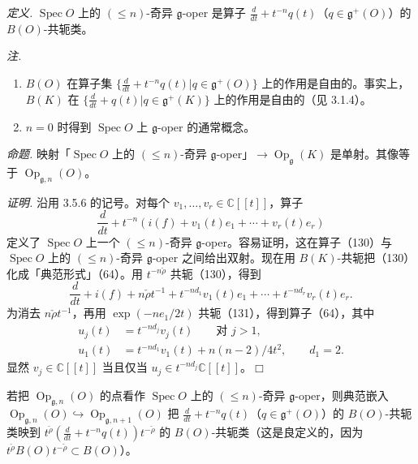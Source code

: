 
 \emph{定义.} $\operatorname{Spec}O$ 上的 $(\le n)$-奇异 $\mathfrak{g}$-oper 是算子 $\frac{d}{dt}+t^{-n}q(t)$（$q\in\mathfrak{g}^{+}(O)$）的 $B(O)$-共轭类。

\emph{注.}
\begin{enumerate}[label=(\roman*),leftmargin=2.2em]
\item $B(O)$ 在算子集 $\{\frac{d}{dt}+t^{-n}q(t)|q\in\mathfrak{g}^{+}(O)\}$ 上的作用是自由的。事实上，$B(K)$ 在 $\{\frac{d}{dt}+q(t)|q\in\mathfrak{g}^{+}(K)\}$ 上的作用是自由的（见 3.1.4）。
\item $n=0$ 时得到 $\operatorname{Spec}O$ 上 $\mathfrak{g}$-oper 的通常概念。
\end{enumerate}

 \emph{命题.} 映射「$\operatorname{Spec}O$ 上的 $(\le n)$-奇异 $\mathfrak{g}$-oper」$\to\operatorname{Op}_{\mathfrak{g}}(K)$ 是单射。其像等于 $\operatorname{Op}_{\mathfrak{g},n}(O)$。

\emph{证明.} 沿用 3.5.6 的记号。对每个 $v_{1},\ldots,v_{r}\in\mathbb{C}[[t]]$，算子
\begin{equation}\tag{130}
  \frac{d}{dt}+t^{-n}(i(f)+v_{1}(t)e_{1}+\cdots+v_{r}(t)e_{r})
\end{equation}
定义了 $\operatorname{Spec}O$ 上一个 $(\le n)$-奇异 $\mathfrak{g}$-oper。容易证明，这在算子（130）与 $\operatorname{Spec}O$ 上的 $(\le n)$-奇异 $\mathfrak{g}$-oper 之间给出双射。现在用 $B(K)$-共轭把（130）化成「典范形式」（64）。用 $t^{-n\check\rho}$ 共轭（130），得到
\begin{equation}\tag{131}
  \frac{d}{dt}+i(f)+n\check\rho t^{-1}+t^{-nd_{1}}v_{1}(t)e_{1}+\cdots+t^{-nd_{r}}v_{r}(t)e_{r}.
\end{equation}
为消去 $n\check\rho t^{-1}$，再用 $\exp(-ne_{1}/2t)$ 共轭（131），得到算子（64），其中
\[
\begin{aligned}
  u_{j}(t)&=t^{-nd_{j}}v_{j}(t) \qquad \text{对 } j>1,\\
  u_{1}(t)&=t^{-nd_{1}}v_{1}(t)+n(n-2)/4t^{2},\qquad d_{1}=2.
\end{aligned}
\]
显然 $v_{j}\in\mathbb{C}[[t]]$ 当且仅当 $u_{j}\in t^{-nd_{j}}\mathbb{C}[[t]]$。\hfill$\Box$

 若把 $\operatorname{Op}_{\mathfrak{g},n}(O)$ 的点看作 $\operatorname{Spec}O$ 上的 $(\le n)$-奇异 $\mathfrak{g}$-oper，则典范嵌入 $\operatorname{Op}_{\mathfrak{g},n}(O)\hookrightarrow\operatorname{Op}_{\mathfrak{g},n+1}(O)$ 把 $\frac{d}{dt}+t^{-n}q(t)$（$q\in\mathfrak{g}^{+}(O)$）的 $B(O)$-共轭类映到 $t^{\check\rho}(\frac{d}{dt}+t^{-n}q(t))t^{-\check\rho}$ 的 $B(O)$-共轭类（这是良定义的，因为 $t^{\check\rho}B(O)t^{-\check\rho}\subset B(O)$）。

